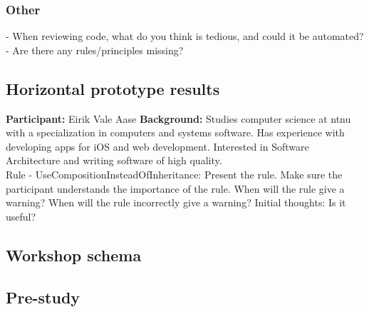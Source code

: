 \subsubsection*{Other} 
- When reviewing code, what do you think is tedious, and could it be automated?
- Are there any rules/principles missing?

 
\subsection{Horizontal prototype results}
\textbf{Participant:} Eirik Vale Aase \newline
\textbf{Background:} Studies computer science at \gls{ntnu} with a specialization in computers and systems software. Has experience with developing apps for iOS and web development. Interested in Software Architecture and writing software of high quality. \\
Rule - UseCompositionInsteadOfInheritance:
Present the rule. Make sure the participant understands the importance of the rule. When will the rule give a warning? When will the rule incorrectly give a warning?
Initial thoughts:
Is it useful?

\clearpage
\subsection{Workshop schema}
\label{workshop-schema}


\subsection{Pre-study}
